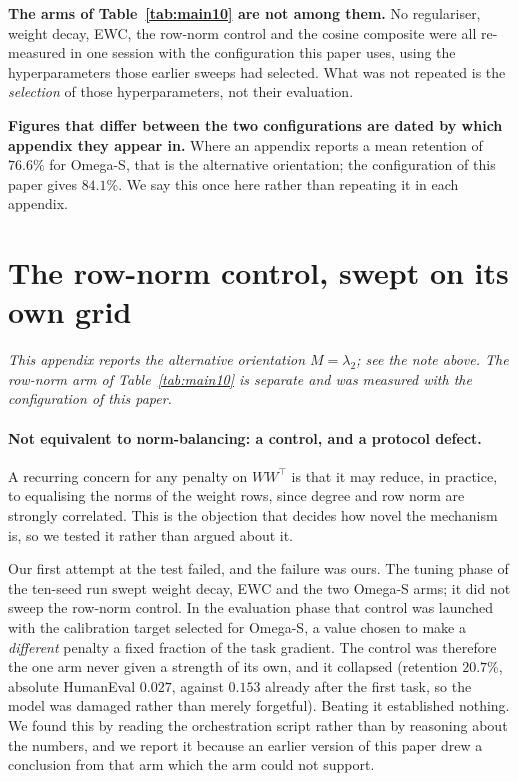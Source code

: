 \documentclass[11pt,a4paper]{article}
\begin{document}
\textbf{The arms of Table~\ref{tab:main10} are not among them.} No regulariser,
weight decay, EWC, the row-norm control and the cosine composite were all
re-measured in one session with the configuration this paper uses, using the
hyperparameters those earlier sweeps had selected. What was not repeated is the
\emph{selection} of those hyperparameters, not their evaluation.

\textbf{Figures that differ between the two configurations are dated by
which appendix they appear in.} Where an appendix reports a mean retention of
$76.6\%$ for Omega-S, that is the alternative orientation; the configuration of
this paper gives $84.1\%$. We say this once here rather than repeating it in
each appendix.

\section{The row-norm control, swept on its own grid}
\label{app:normbal}

\noindent\emph{This appendix reports the alternative orientation
$M = \lambda_2$; see the note above. The row-norm arm of
Table~\ref{tab:main10} is separate and was measured with the configuration of
this paper.}

\paragraph{Not equivalent to norm-balancing: a control, and a protocol defect.}
A recurring concern for any penalty on $WW^\top$ is that it may reduce, in
practice, to equalising the norms of the weight rows, since degree and row norm
are strongly correlated. This is the objection that decides how novel the
mechanism is, so we tested it rather than argued about it.

Our first attempt at the test failed, and the failure was ours. The tuning
phase of the ten-seed run swept weight decay, EWC and the two Omega-S arms; it
did not sweep the row-norm control. In the evaluation phase that control was
launched with the calibration target selected for Omega-S, a value chosen to
make a \emph{different} penalty a fixed fraction of the task gradient. The
control was therefore the one arm never given a strength of its own, and it
collapsed (retention $20.7\%$, absolute HumanEval $0.027$, against $0.153$
already after the first task, so the model was damaged rather than merely
forgetful). Beating it established nothing. We found this by reading the
orchestration script rather than by reasoning about the numbers, and we report
it because an earlier version of this paper drew a conclusion from that arm
which the arm could not support.
\end{document}
